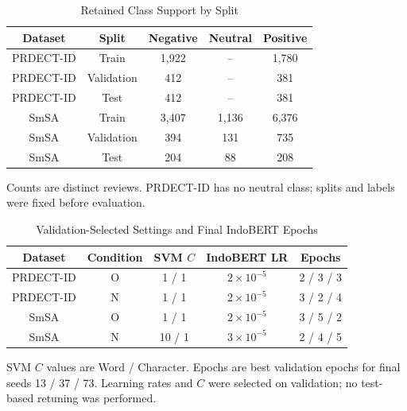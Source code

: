 \documentclass[conference]{IEEEtran}
\begin{document}
\begin{table}[!ht]
\caption{Retained Class Support by Split}
\centering\small
\renewcommand{\arraystretch}{1.06}
\setlength{\tabcolsep}{2pt}
\begin{tabular}{|c|c|c|c|c|}
\hline
\textbf{Dataset} & \textbf{Split} & \textbf{Negative} & \textbf{Neutral} & \textbf{Positive} \\
\hline
PRDECT-ID & Train & 1,922 & -- & 1,780 \\
\hline
PRDECT-ID & Validation & 412 & -- & 381 \\
\hline
PRDECT-ID & Test & 412 & -- & 381 \\
\hline
SmSA & Train & 3,407 & 1,136 & 6,376 \\
\hline
SmSA & Validation & 394 & 131 & 735 \\
\hline
SmSA & Test & 204 & 88 & 208 \\
\hline
\end{tabular}
\par\vspace{3pt}\raggedright\small Counts are distinct reviews. PRDECT-ID has no neutral class; splits and labels were fixed before evaluation.
\end{table}
\begin{table}[!ht]
\caption{Validation-Selected Settings and Final IndoBERT Epochs}
\centering\small
\renewcommand{\arraystretch}{1.06}
\setlength{\tabcolsep}{1.5pt}
\begin{tabular}{|c|c|c|c|c|}
\hline
\textbf{Dataset} & \textbf{Condition} & \textbf{SVM $C$} & \textbf{IndoBERT LR} & \textbf{Epochs} \\
\hline
PRDECT-ID & O & 1 / 1 & $2\times10^{-5}$ & 2 / 3 / 3 \\
\hline
PRDECT-ID & N & 1 / 1 & $2\times10^{-5}$ & 3 / 2 / 4 \\
\hline
SmSA & O & 1 / 1 & $2\times10^{-5}$ & 3 / 5 / 2 \\
\hline
SmSA & N & 10 / 1 & $3\times10^{-5}$ & 2 / 4 / 5 \\
\hline
\end{tabular}
\par\vspace{3pt}\raggedright\small SVM $C$ values are Word / Character. Epochs are best validation epochs for final seeds 13 / 37 / 73. Learning rates and $C$ were selected on validation; no test-based retuning was performed.
\end{table}
\end{document}
